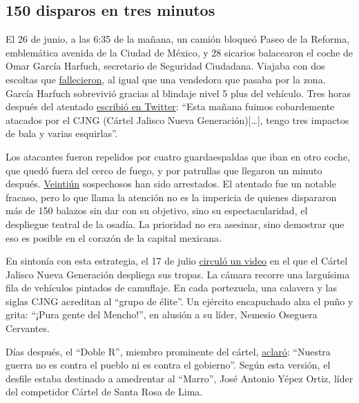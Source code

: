 \hypertarget{150-disparos-en-tres-minutos}{%
\subsection{150 disparos en tres
minutos}\label{150-disparos-en-tres-minutos}}

El 26 de junio, a las 6:35 de la mañana, un camión bloqueó Paseo de la
Reforma, emblemática avenida de la Ciudad de México, y 28 sicarios
balacearon el coche de Omar García Harfuch, secretario de Seguridad
Ciudadana. Viajaba con dos escoltas que
\href{https://www.animalpolitico.com/2020/06/minutos-segundos-atentado-contra-garcia-harfuch/}{fallecieron},
al igual que una vendedora que pasaba por la zona. García Harfuch
sobrevivió gracias al blindaje nivel 5 plus del vehículo. Tres horas
después del atentado
\href{https://twitter.com/OHarfuch/status/1276523720022962177}{escribió
en Twitter}: ``Esta mañana fuimos cobardemente atacados por el CJNG
(Cártel Jalisco Nueva Generación){[}\ldots{}{]}, tengo tres impactos de
bala y varias esquirlas''.

Los atacantes fueron repelidos por cuatro guardaespaldas que iban en
otro coche, que quedó fuera del cerco de fuego, y por patrullas que
llegaron un minuto después.
\href{https://www.animalpolitico.com/2020/06/dos-detenidos-mas-atentado-harfuch/}{Veintiún}
sospechosos han sido arrestados. El atentado fue un notable fracaso,
pero lo que llama la atención no es la impericia de quienes dispararon
más de 150 balazos sin dar con su objetivo, sino su espectacularidad, el
despliegue teatral de la osadía. La prioridad no era asesinar, sino
demostrar que eso es posible en el corazón de la capital mexicana.

En sintonía con esta estrategia, el 17 de julio
\href{https://www.animalpolitico.com/2020/07/grupo-elite-cartel-jalisco-videos-sedena/}{circuló
un video} en el que el Cártel Jalisco Nueva Generación despliega sus
tropas. La cámara recorre una larguísima fila de vehículos pintados de
camuflaje. En cada portezuela, una calavera y las siglas CJNG acreditan
al ``grupo de élite''. Un ejército encapuchado alza el puño y grita:
``¡Pura gente del Mencho!'', en alusión a su líder, Nemesio Oseguera
Cervantes.

Días después, el ``Doble R'', miembro prominente del cártel,
\href{https://www.sinembargo.mx/23-07-2020/3829062}{aclaró}: ``Nuestra
guerra no es contra el pueblo ni es contra el gobierno''. Según esta
versión, el desfile estaba destinado a amedrentar al ``Marro'', José
Antonio Yépez Ortiz, líder del competidor Cártel de Santa Rosa de Lima.

